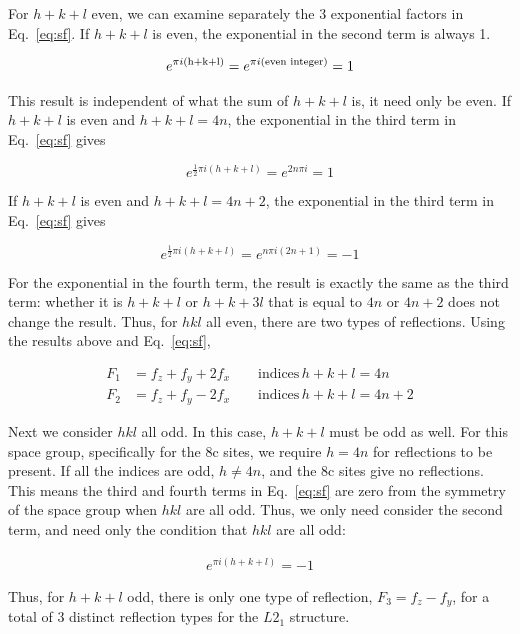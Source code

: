 \documentclass[aps,amsmath,amssymb,prb,superscriptaddress,longtable,preprint,fleqn]{revtex4}
\begin{document}
For $h+k+l$ even, we can examine separately the 3 exponential factors in Eq.~\ref{eq:sf}. If $h+k+l$ is even, the exponential in the second term is always 1.

\begin{align}
 e^{\pi i\left(\text{h+k+l}\right)} = e^{\pi i\left(\text{\text{even integer}}\right)} = 1
\end{align}

This result is independent of what the sum of $h+k+l$ is, it need only be even. If $h+k+l$ is even and $h+k+l=4n$, the exponential in the third term in Eq.~\ref{eq:sf} gives

\begin{equation}
e^{\frac{1}{2}\pi i\left(h+k+l\right)} = e^{2n\pi i} = 1
\end{equation}

\noindent If $h+k+l$ is even and $h+k+l=4n+2$, the exponential in the third term in Eq.~\ref{eq:sf} gives

\begin{equation}
e^{\frac{1}{2}\pi i\left(h+k+l\right)} = e^{n\pi i \left(2n+1\right)} = -1
\end{equation}

For the exponential in the fourth term, the result is exactly the same as the third term: whether it is $h+k+l$ or $h+k+3l$ that is equal to $4n$ or $4n+2$ does not change the result. Thus, for $hkl$ all even, there are two types of reflections. Using the results above and Eq.~\ref{eq:sf},

\begin{align}
F_1 &= f_z + f_y + 2f_x \qquad \text{indices}\, h+k+l = 4n\\
F_2 &= f_z+ f_y - 2f_x \qquad \text{indices}\,  h+k+l = 4n+2
\end{align}

Next we consider $hkl$ all odd. In this case, $h+k+l$ must be odd as well. For this space group, specifically for the 8c sites, we require $h=4n$ for reflections to be present.\cite{itc} If all the indices are odd, $h\neq4n$, and the 8c sites give no reflections. This means the third and fourth terms in Eq.~\ref{eq:sf} are zero from the symmetry of the space group when $hkl$ are all odd. Thus, we only need consider the second term, and need only the condition that $hkl$ are all odd:

\begin{align}
e^{\pi i\left(h+k+l\right)} = -1
\end{align}

Thus, for $h+k+l$ odd, there is only one type of reflection, $F_3 = f_z-f_y$, for a total of 3 distinct reflection types for the $L2_1$ structure.
\end{document}
